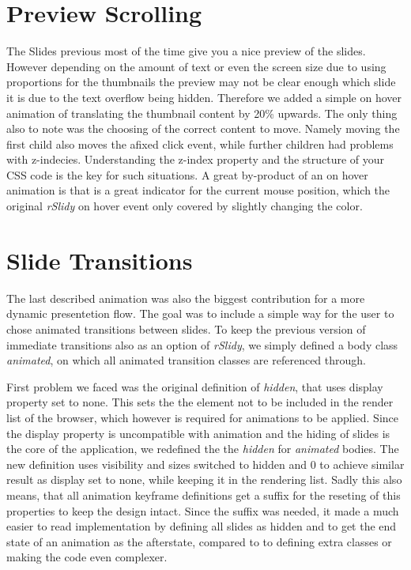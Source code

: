 
\section{Preview Scrolling} %
\label{sec:preview_scrolling}

The Slides previous most of the time give you a nice preview of the slides. 
However depending on the amount of text or even the screen size due to using 
proportions for the thumbnails the preview may not be clear enough which slide 
it is due to the text overflow being hidden. Therefore we added a simple on 
hover animation of translating the thumbnail content by 20\% upwards. The only 
thing also to note was the choosing of the correct content to move. Namely 
moving the first child also moves the afixed click event, while further 
children had problems with z-indecies. Understanding the z-index property and 
the structure of your CSS code is the key for such situations. A great 
by-product of an on hover animation is that is a great indicator for the 
current mouse position, which the original \textit{rSlidy} on hover event only 
covered by slightly changing the color.

\newpage
\section{Slide Transitions} %
\label{sec:slide_transitions}

The last described animation was also the biggest contribution for a more 
dynamic presentetion flow. The goal was to include a simple way for the user to 
chose animated transitions between slides. To keep the previous version of 
immediate transitions also as an option of \textit{rSlidy}, we simply defined a 
body class \textit{animated}, on which all animated transition classes are 
referenced through.

First problem we faced was the original definition of \textit{hidden}, that 
uses display property set to none. This sets the the element not to be included 
in the render list of the browser, which however is required for animations to 
be applied. Since the display property is uncompatible with animation and the 
hiding of slides is the core of the application, we redefined the the 
\textit{hidden} for \textit{animated} bodies. The new definition uses 
visibility and sizes switched to hidden and 0 to achieve similar result as 
display set to none, while keeping it in the rendering list. Sadly this also 
means, that all animation keyframe definitions get a suffix for the reseting of 
this properties to keep the design intact. Since the suffix was needed, it made 
a much easier to read implementation by defining all slides as hidden and to 
get the end state of an animation as the afterstate, compared to to defining 
extra classes or making the code even complexer.

